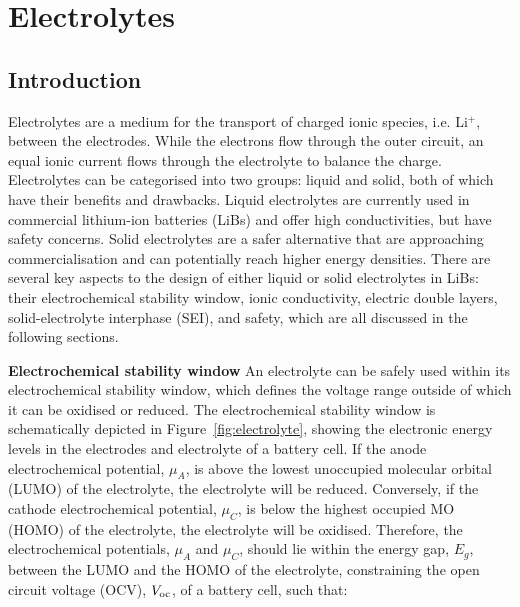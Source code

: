 \documentclass[../main.tex]{subfiles}
\begin{document}
\section{Electrolytes}
\label{sec:electrolytes}
\subsection{Introduction}
\label{sec:electrolytes_introduction}
Electrolytes are a medium for the transport of charged ionic species, i.e. Li$^+$, between the electrodes.\cite{Schmickler2010,Bard2010} While the electrons flow through the outer circuit, an equal ionic current flows through the electrolyte to balance the charge. Electrolytes can be categorised into two groups: liquid and solid, both of which have their benefits and drawbacks. Liquid electrolytes are currently used in commercial lithium-ion batteries (LiBs) and offer high conductivities, but have safety concerns.\cite{kralisch2005energetic, smiglak2006combustible,ding2013effects} Solid electrolytes are a safer alternative that are approaching commercialisation and can potentially reach higher energy densities.\cite{janek_solid_2016} There are several key aspects to the design of either liquid or solid electrolytes in LiBs: their electrochemical stability window,\cite{Goodenough2010, kazemiabnavi2016electrochemical} ionic conductivity,\cite{park2010review,Kamaya2011} electric double layers,\cite{Schmickler2010,Swift2021} solid-electrolyte interphase (SEI),\cite{Xu2011,Yu2017} and safety, which are all discussed in the following sections.\cite{Xu2004,Xu2014}

\textbf{Electrochemical stability window} An electrolyte can be safely used within its electrochemical stability window, which defines the voltage range outside of which it can be oxidised or reduced.\cite{Goodenough2010} The electrochemical stability window is schematically depicted in Figure~\ref{fig:electrolyte}, showing the electronic energy levels in the electrodes and electrolyte of a battery cell. If the anode electrochemical potential, $\mu_{A}$, is above the lowest unoccupied molecular orbital (LUMO) of the electrolyte, the electrolyte will be reduced. Conversely, if the cathode electrochemical potential, $\mu_{C}$, is below the highest occupied MO (HOMO) of the electrolyte, the electrolyte will be oxidised. Therefore, the electrochemical potentials, $\mu_{A}$ and $\mu_{C}$, should lie within the energy gap, $E_g$, between the LUMO and the HOMO of the electrolyte, constraining the open circuit voltage (OCV), $V_{\rm oc}$, of a battery cell, such that:\cite{Goodenough2010}
\end{document}
